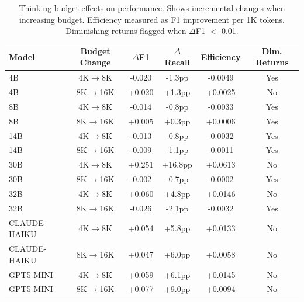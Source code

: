 


\begin{table}[t]
\centering
\small
\caption{Thinking budget effects on performance. Shows incremental changes when increasing budget. Efficiency measured as F1 improvement per 1K tokens. Diminishing returns flagged when $\Delta$F1 $<$ 0.01.}
\label{tab:budget_effects}
\begin{tabular}{lccccc}
\toprule
\textbf{Model} & \textbf{Budget Change} & \textbf{$\Delta$F1} & \textbf{$\Delta$Recall} & \textbf{Efficiency} & \textbf{Dim. Returns} \\
\midrule
4B  & 4K$\rightarrow$8K & -0.020 & -1.3pp & -0.0049 & Yes \\
4B  & 8K$\rightarrow$16K & +0.020 & +1.3pp & +0.0025 & No \\
8B  & 4K$\rightarrow$8K & -0.014 & -0.8pp & -0.0033 & Yes \\
8B  & 8K$\rightarrow$16K & +0.005 & +0.3pp & +0.0006 & Yes \\
14B & 4K$\rightarrow$8K & -0.013 & -0.8pp & -0.0032 & Yes \\
14B & 8K$\rightarrow$16K & -0.009 & -1.1pp & -0.0011 & Yes \\
30B & 4K$\rightarrow$8K & +0.251 & +16.8pp & +0.0613 & No \\
30B & 8K$\rightarrow$16K & -0.002 & -0.7pp & -0.0002 & Yes \\
32B & 4K$\rightarrow$8K & +0.060 & +4.8pp & +0.0146 & No \\
32B & 8K$\rightarrow$16K & -0.026 & -2.1pp & -0.0032 & Yes \\
CLAUDE-HAIKU & 4K$\rightarrow$8K & +0.054 & +5.8pp & +0.0133 & No \\
CLAUDE-HAIKU & 8K$\rightarrow$16K & +0.047 & +6.0pp & +0.0058 & No \\
GPT5-MINI & 4K$\rightarrow$8K & +0.059 & +6.1pp & +0.0145 & No \\
GPT5-MINI & 8K$\rightarrow$16K & +0.077 & +9.0pp & +0.0094 & No \\
\bottomrule
\end{tabular}
\end{table}




